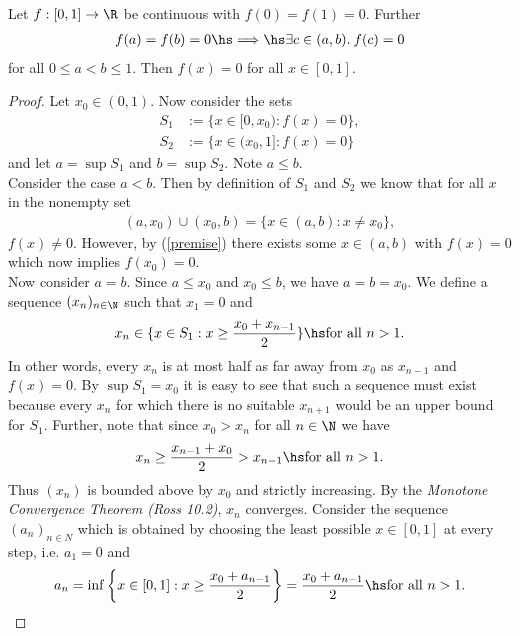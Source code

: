 \documentclass{article}
\begin{document}
\begin{claim*}
	Let $f:[0,1]\to\R$ be continuous with $f(0)=f(1)=0$. Further
	\begin{align}
		\label{premise}
		f(a)=f(b)=0 \hs\Longrightarrow\hs \exists c\in(a,b).\: f(c)=0
	\end{align}
	for all $0\leq a<b\leq 1$. Then $f(x)=0$ for all $x\in[0,1]$.
\end{claim*}

\begin{proof}
	Let $x_0\in(0,1)$. Now consider the sets
	\begin{align*}
		S_1 & := \{x\in[0,x_0) : f(x) = 0\}, \\
		S_2 & := \{x\in(x_0,1] : f(x) = 0\}
	\end{align*}
	and let $a=\sup S_1$ and $b=\sup S_2$. Note $a\leq b$.\\
	\indent Consider the case $a<b$. Then by definition of $S_1$ and $S_2$
	we know that for all $x$ in the nonempty set
	\begin{align*}
		(a,x_0)\cup(x_0,b)=\{x\in(a,b):x\not=x_0\},
	\end{align*}
	$f(x)\not=0$.
	However, by (\ref{premise}) there exists some $x\in(a,b)$ with $f(x)=0$
	which now implies $f(x_0)=0$.\\
	\indent Now consider $a=b$. Since $a\leq x_0$ and $x_0\leq b$, we have
	$a=b=x_0$. We define a sequence $(x_n)_{n\in\N}$ such that $x_1=0$ and
	\begin{align*}
		x_n \in\{x\in S_1 : x\geq \frac{x_0+x_{n-1}}{2}\} \hs\text{for all }n>1.
	\end{align*}
	In other words, every $x_n$ is at most half as far away from $x_0$
	as $x_{n-1}$ and $f(x)=0$. By $\sup S_1 = x_0$ it is easy to see that such
	a sequence must exist because every $x_n$ for which there is no suitable
	$x_{n+1}$ would be an upper bound for $S_1$. Further, note that since $x_0>x_n$
	for all $n\in\N$ we have
	\begin{align*}
		x_n \geq \frac{x_{n-1}+x_0}{2} > x_{n-1} \hs\text{for all }n>1.
	\end{align*}
	Thus $(x_n)$ is bounded above by $x_0$ and strictly increasing. By the
	\emph{Monotone Convergence Theorem (Ross 10.2)}, $x_n$ converges. Consider
	the sequence $(a_n)_{n\in N}$ which is obtained by choosing the least possible
	$x\in[0,1]$ at every step, i.e. $a_1=0$ and
	\begin{align*}
		a_n = \inf\left\lbrace x\in [0,1] : x \geq \frac{x_0+a_{n-1}}{2}\right\rbrace = \frac{x_0+a_{n-1}}{2}
		\hs\text{for all }n>1.

\end{align*}
\end{proof}
\end{document}
